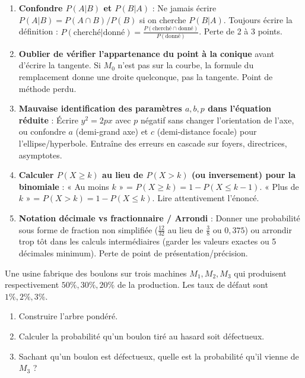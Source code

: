 \documentclass[11pt]{article}
\newcounter{popsec}
\newcounter{popsub}
\newcommand{\courssub}[1]{%
  \stepcounter{popsub}%
  \par\vspace{9pt}\noindent{\popxbold\fontsize{11.5}{13}\selectfont\color{popink}{\color{poporange}\thepopsec.\thepopsub}\hspace{6pt}#1}\par\nopagebreak\vspace{4pt}
}
\begin{document}
\begin{attention}
    \begin{enumerate}
        \item \textbf{Confondre $P(A|B)$ et $P(B|A)$} : Ne jamais écrire $P(A|B) = P(A \cap B)/P(B)$ si on cherche $P(B|A)$. Toujours écrire la définition : $P(\text{cherché}|\text{donné}) = \frac{P(\text{cherché} \cap \text{donné})}{P(\text{donné})}$. Perte de 2 à 3 points.
        \item \textbf{Oublier de vérifier l'appartenance du point à la conique} avant d'écrire la tangente. Si $M_0$ n'est pas sur la courbe, la formule du remplacement donne une droite quelconque, pas la tangente. Point de méthode perdu.
        \item \textbf{Mauvaise identification des paramètres $a, b, p$ dans l'équation réduite} : Écrire $y^2 = 2px$ avec $p$ négatif sans changer l'orientation de l'axe, ou confondre $a$ (demi-grand axe) et $c$ (demi-distance focale) pour l'ellipse/hyperbole. Entraîne des erreurs en cascade sur foyers, directrices, asymptotes.
        \item \textbf{Calculer $P(X \ge k)$ au lieu de $P(X > k)$ (ou inversement) pour la binomiale} : « Au moins $k$ » = $P(X \ge k) = 1 - P(X \le k-1)$. « Plus de $k$ » = $P(X > k) = 1 - P(X \le k)$. Lire attentivement l'énoncé.
        \item \textbf{Notation décimale vs fractionnaire / Arrondi} : Donner une probabilité sous forme de fraction non simplifiée ($\frac{12}{32}$ au lieu de $\frac{3}{8}$ ou $0,375$) ou arrondir trop tôt dans les calculs intermédiaires (garder les valeurs exactes ou 5 décimales minimum). Perte de point de présentation/précision.
    \end{enumerate}
\end{attention}

\courssub{Exercices d'entraînement}

\begin{exercice}
Une usine fabrique des boulons sur trois machines $M_1, M_2, M_3$ qui produisent respectivement $50\%, 30\%, 20\%$ de la production. Les taux de défaut sont $1\%, 2\%, 3\%$.
\begin{enumerate}
    \item Construire l'arbre pondéré.
    \item Calculer la probabilité qu'un boulon tiré au hasard soit défectueux.
    \item Sachant qu'un boulon est défectueux, quelle est la probabilité qu'il vienne de $M_3$ ?
\end{enumerate}
\end{exercice}
\end{document}
